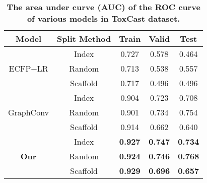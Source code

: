 \documentclass[letterpaper]{article} \usepackage{aaai18}  \usepackage{times}  \usepackage{helvet}  \usepackage{courier}  \usepackage{url}  \usepackage{graphicx}  \usepackage{amsmath}
\begin{document}
\begin{table}[!h]
\caption{\textbf{The area under curve (AUC) of the ROC curve of various models in ToxCast dataset.} }
\label{tbl::toxcast}
\vskip 0.15in
\begin{center}
\begin{small}
\begin{tabular}{|c|c|c|c|c|}
\hline
Model                           & Split Method    & Train         &Valid         & Test \\
\hline
\multirow{3}{*}{ECFP+LR}        & Index      &   0.727       &   0.578      &   0.464  \\
                                & Random     &   0.713       &   0.538      &   0.557  \\
                                & Scaffold   &   0.717       &   0.496      &   0.496  \\
\hline
\multirow{3}{*}{GraphConv}      & Index      &   0.904       &   0.723      &   0.708  \\
                                & Random     &   0.901       &   0.734      &   0.754  \\
                                & Scaffold   &   0.914       &   0.662      &   0.640  \\
\hline
\multirow{3}{*}{\textbf{Our}}   & Index      &\textbf{0.927} &\textbf{0.747} &\textbf{0.734}\\
                                & Random     &\textbf{0.924} &\textbf{0.746} &\textbf{0.768}\\
                                & Scaffold   &\textbf{0.929} &\textbf{0.696} &\textbf{0.657}\\  
\hline
\end{tabular}
\end{small}
\end{center}
\vskip -0.1in
\end{table}
\end{document}
